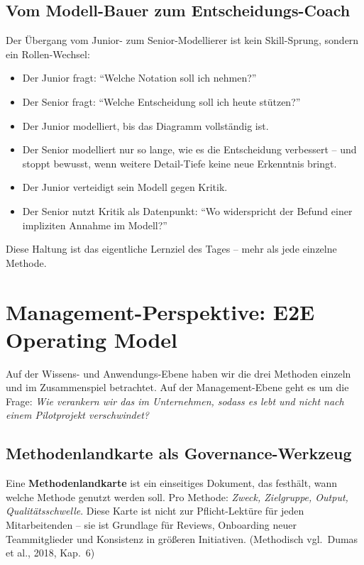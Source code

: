 \documentclass[11pt,a4paper,oneside]{article}
\newcommand{\fachbegriff}[1]{\textbf{#1}}
\newcommand{\quelle}[1]{{\footnotesize\color{lpGray}(#1)}}
\begin{document}
\subsection{Vom Modell-Bauer zum Entscheidungs-Coach}

Der Übergang vom Junior- zum Senior-Modellierer ist kein Skill-Sprung, sondern ein Rollen-Wechsel:

\begin{itemize}
  \item Der Junior fragt: ``Welche Notation soll ich nehmen?''
  \item Der Senior fragt: ``Welche Entscheidung soll ich heute stützen?''
  \item Der Junior modelliert, bis das Diagramm vollständig ist.
  \item Der Senior modelliert nur so lange, wie es die Entscheidung verbessert -- und stoppt bewusst, wenn weitere Detail-Tiefe keine neue Erkenntnis bringt.
  \item Der Junior verteidigt sein Modell gegen Kritik.
  \item Der Senior nutzt Kritik als Datenpunkt: ``Wo widerspricht der Befund einer impliziten Annahme im Modell?''
\end{itemize}

Diese Haltung ist das eigentliche Lernziel des Tages -- mehr als jede einzelne Methode.

\section{Management-Perspektive: E2E Operating Model}

Auf der Wissens- und Anwendungs-Ebene haben wir die drei Methoden einzeln und im Zusammenspiel betrachtet. Auf der Management-Ebene geht es um die Frage: \emph{Wie verankern wir das im Unternehmen, sodass es lebt und nicht nach einem Pilotprojekt verschwindet?}

\subsection{Methodenlandkarte als Governance-Werkzeug}

Eine \fachbegriff{Methodenlandkarte} ist ein einseitiges Dokument, das festhält, wann welche Methode genutzt werden soll. Pro Methode: \emph{Zweck, Zielgruppe, Output, Qualitätsschwelle}. Diese Karte ist nicht zur Pflicht-Lektüre für jeden Mitarbeitenden -- sie ist Grundlage für Reviews, Onboarding neuer Teammitglieder und Konsistenz in größeren Initiativen. \quelle{Methodisch vgl.\ Dumas et al., 2018, Kap.~6}
\end{document}
